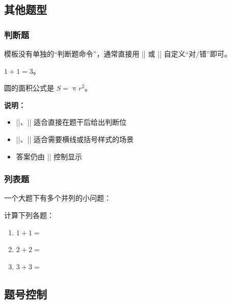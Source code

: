 \subsection{其他题型}

\subsubsection{判断题}

模板没有单独的“判断题命令”，通常直接用 |\paren| 或 |\fillin| 自定义“对/错”即可。

\begin{latexcode}
  \begin{question}
    $1 + 1 = 3$。\paren[错]
  \end{question}

  \begin{question}
    圆的面积公式是 $S = \uppi r^2$。\fillin[对]
  \end{question}
\end{latexcode}

\textbf{说明：}
\begin{itemize}
  \item |\paren[对]|、|\paren[错]| 适合直接在题干后给出判断位
  \item |\fillin[对]|、|\fillin[错]| 适合需要横线或括号样式的场景
  \item 答案仍由 || 控制显示
\end{itemize}

\subsubsection{列表题}

一个大题下有多个并列的小问题：

\begin{latexcode}
  \begin{question}
    计算下列各题：
    \begin{enumerate}
      \item $1 + 1 = $ \fillin[2]
      \item $2 + 2 = $ \fillin[4]
      \item $3 + 3 = $ \fillin[6]
    \end{enumerate}
  \end{question}
\end{latexcode}


\subsection{题号控制}


